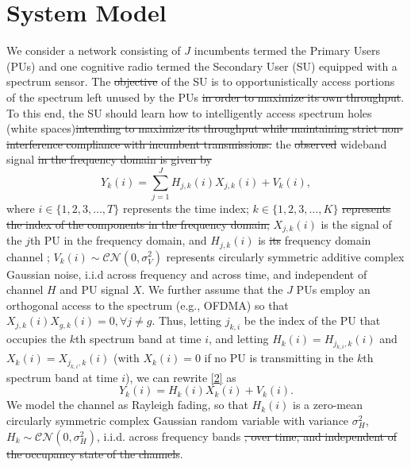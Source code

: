 \documentclass[10pt,twocolumn]{IEEEtran}
\newcommand{\sst}[1]{\st{#1}}
\newcommand{\add}[1]{{\color{red}{#1}}}
\begin{document}
\section{System Model}\label{II}
We consider a network consisting of $J$ incumbents termed the Primary Users (PUs) and one cognitive radio termed the Secondary User (SU) equipped with a spectrum sensor. The\sst{ objective} \add{goal} of the SU is to \add{maximize its own throughput by} opportunistically access\add{ing} portions of the spectrum left unused by the PUs\sst{ in order to maximize its own throughput}. To this end, the SU should learn how to intelligently access spectrum holes (white spaces)\add{ to achieve this goal,  while maintaining strict non-interference compliance with incumbent transmissions.}\sst{intending to maximize its throughput while maintaining strict non-interference compliance with incumbent transmissions.}
 \add{We express}
the\sst{ observed} wideband \add{frequency domain} signal \add{received at the SU as}\sst{ in the frequency domain is given by}
\begin{equation}\label{2}
    Y_k(i) = \sum_{j=1}^{J} H_{j,k}(i)X_{j,k}(i) + V_k(i),
\end{equation}
where $i {\in} \{1,2,3,\dots,T\}$ represents the time index; $k {\in} \{1,2,3,\dots,K\}$
\add{is the frequency domain channel index;}\sst{
 represents the index of the components in the frequency domain;} $X_{j,k}(i)$ is the signal of the $j$th PU in the frequency domain, and $H_{j,k}(i)$ is\sst{ its} \add{the} frequency domain channel \add{between the $j$th PU and the SU}; $V_k(i) {\sim} \mathcal{CN}(0,\sigma_V^2)$ represents circularly symmetric additive complex Gaussian noise, i.i.d across frequency and across time, and independent of channel $H$ and PU signal $X$. We further assume that the $J$ PUs employ an orthogonal access to the spectrum (e.g., OFDMA) so that $X_{j,k}(i)X_{g,k}(i){=}0, \forall j{\neq}g$. Thus, letting $j_{k,i}$ be the index of the PU that occupies the $k$th spectrum band at time $i$, and letting  $H_{k}(i){=}H_{j_{k,i},k}(i)$ and $X_{k}(i){=}X_{j_{k,i},k}(i)$ (with $X_{k}(i){=}0$ if no PU is transmitting in the $k$th spectrum band at time $i$), we can rewrite \eqref{2} as 
\begin{equation}\label{3}
    Y_k(i) = H_{k}(i)X_{k}(i) + V_k(i).
\end{equation}
We model the channel as Rayleigh fading, so that $H_{k}(i)$ is a zero-mean circularly symmetric complex Gaussian random variable with variance $\sigma_H^2$, $H_k {\sim} \mathcal{CN}(0,\sigma_H^2)$, i.i.d. across frequency bands \add{and time}\sst{, over time, and independent of the occupancy state of the channels}.
\end{document}
